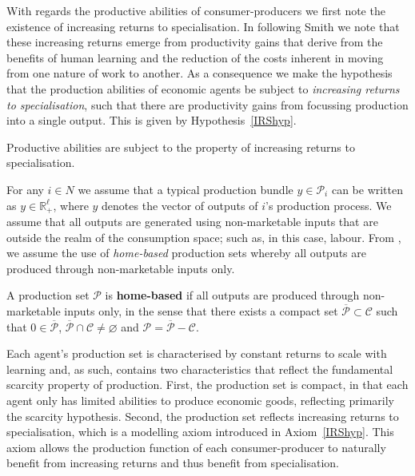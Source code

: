 With regards the productive abilities of consumer-producers we first note the existence of increasing returns to specialisation. In following Smith we note that these increasing returns emerge from productivity gains that derive from the benefits of human learning and the reduction of the costs inherent in moving from one nature of work to another. As a consequence we make the hypothesis that the production abilities of economic agents be subject to \emph{increasing returns to specialisation}, such that there are productivity gains from focussing production into a single output. This is given by Hypothesis~\ref{IRShyp}.
\begin{hypothesis} \label{IRShyp}
Productive abilities are subject to the property of increasing returns to specialisation.
\end{hypothesis}
For any $i \in N$ we assume that a typical production bundle $y \in \mathcal{P}_{i}$ can be written as $y \in \mathbb{R}^{\ell}_{+}$, where $y$ denotes the vector of outputs of $i$'s production process. We assume that all outputs are generated using non-marketable inputs that are outside the realm of the consumption space; such as, in this case, labour. From \citet{Gilles2015IRSpec}, we assume the use of \emph{home-based} production sets whereby all outputs are produced through non-marketable inputs only.
\begin{definition} \label{def:home-based}
A production set $\mathcal{P}$ is \textbf{home-based} if all outputs are produced through non-marketable inputs only, in the sense that there exists a compact set $\overline{\mathcal{P}} \subset \mathcal{C}$ such that $0 \in \overline{\mathcal{P}}$, $\overline{\mathcal{P}} \cap \mathcal{C} \neq \varnothing$ and $\mathcal{P} = \overline{\mathcal{P}} - \mathcal{C}$.
\end{definition}
Each agent's production set is characterised by constant returns to scale with learning and, as such, contains two characteristics that reflect the fundamental scarcity property of production. First, the production set is compact, in that each agent only has limited abilities to produce economic goods, reflecting primarily the scarcity hypothesis. Second, the production set reflects increasing returns to specialisation, which is a modelling axiom introduced in Axiom~\ref{IRShyp}. This axiom allows the production function of each consumer-producer to naturally benefit from increasing returns and thus benefit from specialisation.

